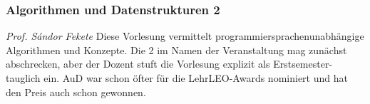 
\subsubsection{Algorithmen und Datenstrukturen 2}
	\textit{Prof. S\'andor Fekete}
	Diese Vorlesung vermittelt programmiersprachenunabhängige Algorithmen und Konzepte. Die \glqq{}2\grqq{} im Namen der Veranstaltung mag zunächst abschrecken, aber der Dozent stuft die Vorlesung explizit als Erstsemester-tauglich ein. AuD war schon öfter für die LehrLEO-Awards nominiert und hat den Preis auch schon gewonnen.